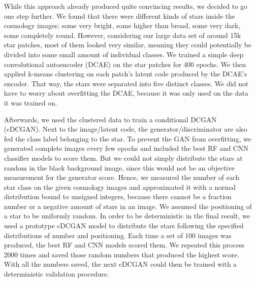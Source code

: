 \documentclass[10pt,conference,compsocconf]{IEEEtran}
\begin{document}
While this approach already produced quite convincing results, we decided to go one step further. We found that there were different kinds of stars inside the cosmology images; some very bright, some higher than broad, some very dark, some completely round. However, considering our large data set of around 15k star patches, most of them looked very similar, meaning they could potentially be divided into some small amount of individual classes. We trained a simple deep convolutional autoencoder (DCAE) on the star patches for 400 epochs. 
We then applied k-means clustering on each patch's latent code produced by the DCAE's encoder. That way, the stars were separated into five distinct classes. We did not have to worry about overfitting the DCAE, because it was only used on the data it was trained on.

Afterwards, we used the clustered data to train a conditional DCGAN (cDCGAN). Next to the image/latent code, the generator/discriminator are also fed the class label belonging to the star. To prevent the GAN from overfitting, we generated complete images every few epochs and included the best RF and CNN classifier models to score them. But we could not simply distribute the stars at random in the black background image, since this would not be an objective measurement for the generator score.
Hence, we measured the number of each star class on the given cosmology images and approximated it with a normal distribution bound to unsigned integers, because there cannot be a fraction number or a negative amount of stars in an image. We assumed the positioning of a star to be uniformly random. In order to be deterministic in the final result, we used a prototype cDCGAN model to distribute the stars following the specified distributions of number and positioning. Each time a set of 100 images was produced, the best RF and CNN models scored them. We repeated this process 2000 times and saved those random numbers that produced the highest score. With all the numbers saved, the next cDCGAN could then be trained with a deterministic validation procedure. 
\end{document}
